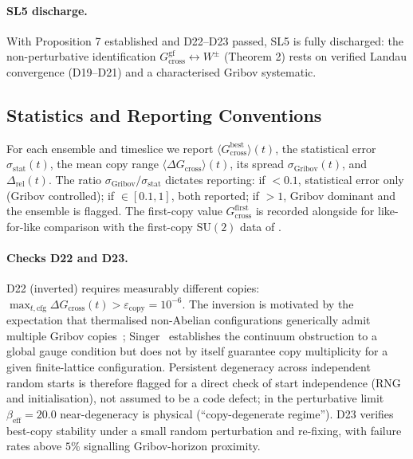 \documentclass[11pt,a4paper]{article}
\theoremstyle{plain}
\theoremstyle{definition}
\theoremstyle{remark}
\newcommand{\SU}{\mathrm{SU}}
\newcommand{\Gcross}{G_{\mathrm{cross}}}
\newcommand{\Gcrossgf}{G_{\mathrm{cross}}^{\mathrm{gf}}}
\newcommand{\be}{\beta_{\mathrm{eff}}}
\begin{document}
\paragraph{SL5 discharge.}
With Proposition 7 established and D22--D23 passed, SL5 is fully
discharged: the non-perturbative identification
$\Gcrossgf\leftrightarrow W^{\pm}$ (Theorem 2) rests on verified Landau
convergence (D19--D21) and a characterised Gribov systematic.

\subsection{Statistics and Reporting Conventions}
\label{ssec:gribovstats}

For each ensemble and timeslice we report
$\langle\Gcross^{\mathrm{best}}\rangle(t)$, the statistical error
$\sigma_{\mathrm{stat}}(t)$, the mean copy range
$\langle\Delta\Gcross\rangle(t)$, its spread
$\sigma_{\mathrm{Gribov}}(t)$, and $\Delta_{\mathrm{rel}}(t)$. The ratio
$\sigma_{\mathrm{Gribov}}/\sigma_{\mathrm{stat}}$ dictates reporting: if
$<0.1$, statistical error only (Gribov controlled); if $\in[0.1,1]$,
both reported; if $>1$, Gribov dominant and the ensemble is flagged. The
first-copy value $\Gcross^{\mathrm{first}}$ is recorded alongside for
like-for-like comparison with the first-copy $\SU(2)$ data of \cite{CM}.

\paragraph{Checks D22 and D23.}
D22 (inverted) requires measurably different copies:
$\max_{t,\mathrm{cfg}}\Delta\Gcross(t)>\varepsilon_{\mathrm{copy}}=10^{-6}$.
The inversion is motivated by the expectation that thermalised
non-Abelian configurations generically admit multiple Gribov
copies~\cite{Gri}; Singer~\cite{Singer} establishes the continuum
obstruction to a global gauge condition but does not by itself guarantee
copy multiplicity for a given finite-lattice configuration. Persistent
degeneracy across independent random starts is therefore flagged for a
direct check of start independence (RNG and initialisation), not assumed
to be a code defect; in the perturbative limit $\be=20.0$ near-degeneracy
is physical (``copy-degenerate regime''). D23
verifies best-copy stability under a small random perturbation and
re-fixing, with failure rates above $5\%$ signalling Gribov-horizon
proximity.

\end{document}
